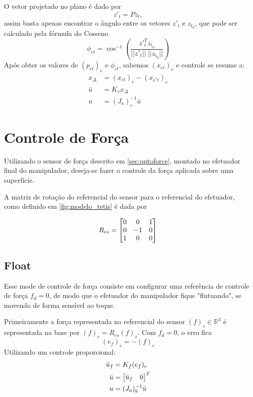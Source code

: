 O vetor projetado no plano é dado por
\begin{equation}
{z'}_{t} = {P} {z}_{t},
\end{equation}
assim basta apenas encontrar o ângulo entre os vetores ${z'}_{t}$ e ${z}_{t_0}$, que pode ser calculado pela fórmula do Cosseno \citep{strang} 
\begin{equation}
\phi_{et} = \cos^{-1} \left( \frac{{z'}^T_{t} {z}_{t_0} } {||{z'}_{t}|| \; ||{z}_{t_0}||} \right)
\end{equation}
Após obter os valores de $(p_{et})_e$ e $\phi_{et}$, sabemos $(x_{et})_e$ e controle se resume a:
\begin{align}
x_\Delta &= ({x}_{et})_e - ({x}_{e^*t})_e\\
{\bar{u}} &= {K}_v {x_\Delta}  \\
{u} &= ({J}_{a})_e^{-1} {\bar{u}}
\end{align}

\section{Controle de Força} \label{sec:force}

Utilizando o sensor de força descrito em \ref{sec:optoforce}, montado no efetuador final do manipulador, deseja-se fazer o controle da força aplicada sobre uma superfície. 

A matriz de rotação do referencial do sensor para o referencial do efetuador, como definido em \ref{fig:modelo_tetis} é dada por

\begin{equation}
R_{es} = \begin{bmatrix}
  0 & 0 & 1 \\
  0 & -1 & 0 \\
  1 & 0 & 0
\end{bmatrix}
\end{equation}

\subsection{Float}  \label{sec:forca_float}
Esse mode de controle de força consiste em configurar uma referência de controle de força ${f}_d = 0$, de modo que o efetuador do manipulador fique "flutuando", se movendo de forma sensível ao toque.

Primeiramente a força representada no referencial do sensor $({f})_s \in \mathbb{R}^3 $ é representada na base por $({f})_e = R_{es} ({f})_s$. Com ${f}_d = 0$, o erro fica
\begin{equation}
({e}_f)_e = - ({f})_e 
\end{equation}
Utilizando um controle proporcional:
\begin{align}
\bar{{u}}_f &= {K}_f ({e}_f)_e \\
\bar{{u}} &= \begin{bmatrix} \bar{{u}}_f & 0\end{bmatrix}^T\\
{u} &= ({J_a})_b^{-1} \bar{{u}}
\end{align}


